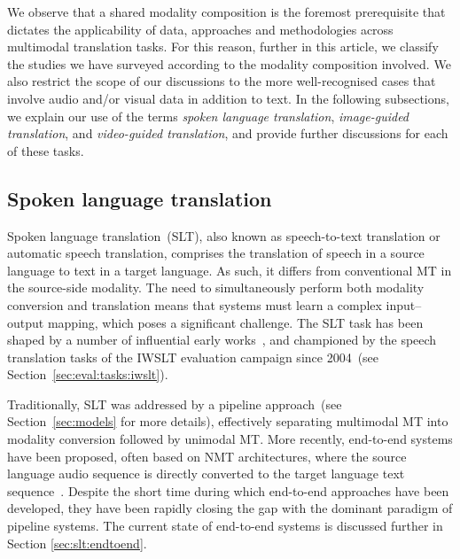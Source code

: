 \documentclass{svjour3}
\newcommand{\eg}[1]{\textit{e.g.}~#1}
\begin{document}
We observe that a shared modality composition is the foremost prerequisite that dictates the applicability of data, approaches and methodologies across multimodal translation tasks. For this reason, further in this article, we classify the studies we have surveyed according to the modality composition involved. We also restrict the scope of our discussions to the more well-recognised cases that involve audio and/or visual data in addition to text. In the following subsections, we explain our use of the terms \textit{spoken language translation}, \textit{image-guided translation}, and \textit{video-guided translation}, and provide further discussions for each of these tasks.
    
    






    \subsection{Spoken language translation}
    \label{sec:tasks:slt}
        
        Spoken language translation~(SLT), also known as speech-to-text translation or automatic speech translation, comprises the translation of speech in a source language to text in a target language. As such, it differs from conventional MT in the source-side modality. The need to simultaneously perform both modality conversion and translation means that systems must learn a complex input--output mapping, which poses a significant challenge. The SLT task has been shaped by a number of influential early works~\citep[\eg{}][]{vidal-finite-1997,ney-speech-1999}, and championed by the speech translation tasks of the IWSLT evaluation campaign since 2004~(see Section~\ref{sec:eval:tasks:iwslt}).
                    
        Traditionally, SLT was addressed by a pipeline approach~(see Section~\ref{sec:models} for more details), effectively separating multimodal MT into modality conversion followed by unimodal MT. More recently, end-to-end systems have been proposed, often based on NMT architectures, where the source language audio sequence is directly converted to the target language text sequence~\citep{weiss-s2s-st-2017, berard-e2e-audiobooks-2018}.
        Despite the short time during which end-to-end approaches have been developed, they have been rapidly closing the gap with the dominant paradigm of pipeline systems. The current state of end-to-end systems is discussed further in Section \ref{sec:slt:endtoend}.
        
\end{document}
